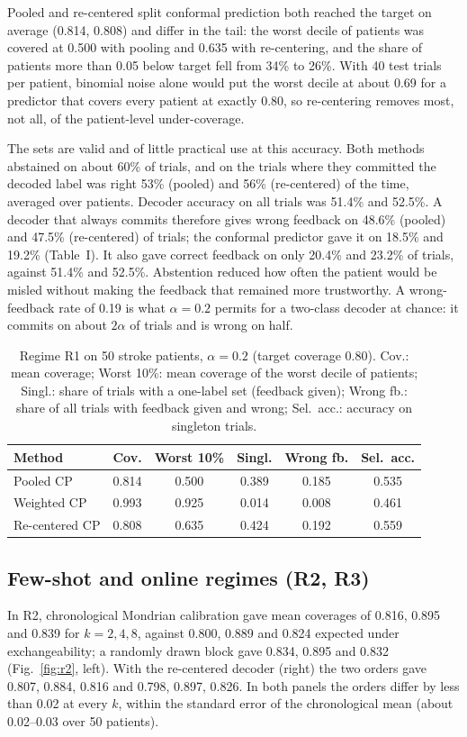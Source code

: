 \documentclass[letterpaper, 10pt, conference]{ieeeconf}
\begin{document}
Pooled and re-centered split conformal prediction both reached the target on
average (0.814, 0.808) and differ in the tail: the worst decile of patients
was covered at 0.500 with pooling and 0.635 with re-centering, and the share of
patients more than 0.05 below target fell from 34\% to 26\%. With 40 test
trials per patient, binomial noise alone would put the worst decile at about
0.69 for a predictor that covers every patient at exactly 0.80, so re-centering
removes most, not all, of the patient-level under-coverage.

The sets are valid and of little practical use at this accuracy. Both methods
abstained on about 60\% of trials, and on the trials where they committed the
decoded label was right 53\% (pooled) and 56\% (re-centered) of the time,
averaged over patients. Decoder accuracy on all trials was 51.4\% and 52.5\%. A
decoder that always commits therefore gives wrong feedback on 48.6\% (pooled)
and 47.5\% (re-centered) of trials; the conformal predictor gave it on 18.5\%
and 19.2\% (Table~I). It also gave correct feedback on only 20.4\% and 23.2\%
of trials, against 51.4\% and 52.5\%.
Abstention reduced how often the patient would be misled without making the
feedback that remained more trustworthy. A wrong-feedback rate of 0.19 is what
$\alpha=0.2$ permits for a two-class decoder at chance: it commits on about
$2\alpha$ of trials and is wrong on half.

\begin{table}[t]
\caption{Regime R1 on 50 stroke patients, $\alpha=0.2$ (target coverage 0.80).
Cov.: mean coverage; Worst 10\%: mean coverage of the worst decile of patients;
Singl.: share of trials with a one-label set (feedback given); Wrong fb.:
share of all trials with feedback given and wrong; Sel.\ acc.: accuracy on
singleton trials.}
\label{tab:r1}
\centering
\small\setlength{\tabcolsep}{3pt}
\begin{tabular}{@{}lccccc@{}}
\toprule
Method & Cov. & Worst 10\% & Singl. & Wrong fb. & Sel.\ acc. \\
\midrule
Pooled CP & 0.814 & 0.500 & 0.389 & 0.185 & 0.535 \\
Weighted CP & 0.993 & 0.925 & 0.014 & 0.008 & 0.461 \\
Re-centered CP & 0.808 & 0.635 & 0.424 & 0.192 & 0.559 \\
\bottomrule
\end{tabular}
\end{table}

\subsection{Few-shot and online regimes (R2, R3)}
In R2, chronological Mondrian calibration gave mean coverages of 0.816, 0.895
and 0.839 for $k=2,4,8$, against 0.800, 0.889 and 0.824 expected under
exchangeability; a randomly drawn block gave 0.834, 0.895 and 0.832
(Fig.~\ref{fig:r2}, left). With the re-centered decoder (right) the two orders
gave 0.807, 0.884, 0.816 and 0.798, 0.897, 0.826. In both panels the orders
differ by less than 0.02 at every $k$, within
the standard error of the chronological mean (about 0.02--0.03 over 50
patients).
\end{document}
